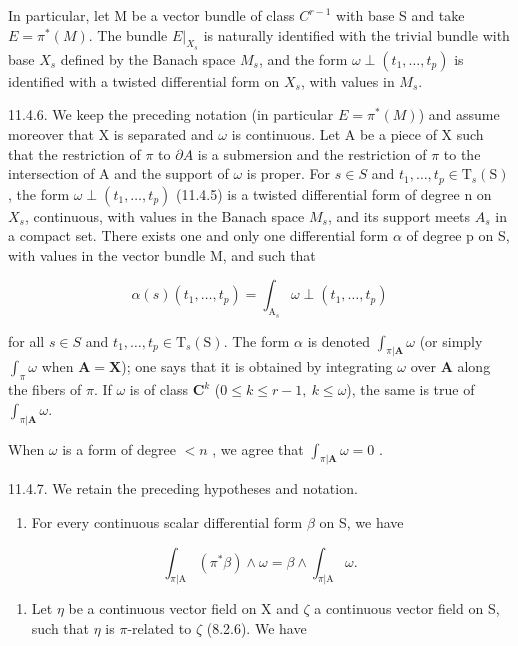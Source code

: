 In particular, let M be a vector bundle of class \(C^{r-1}\) with base S and take \(E = \pi^{*}(M)\). The bundle \(E|_{X_{s}}\) is naturally identified with the trivial bundle with base \(X_{s}\) defined by the Banach space \(M_{s}\), and the form \(\omega\perp(t_{1},\ldots,t_{p})\) is identified with a twisted differential form on \(X_{s}\), with values in \(M_{s}\).

11.4.6. We keep the preceding notation (in particular \(E=\pi^{*}(M)\)) and assume moreover that X is separated and \(\omega\) is continuous. Let A be a piece of X such that the restriction of \(\pi\) to \(\partial A\) is a submersion and the restriction of \(\pi\) to the intersection of A and the support of \(\omega\) is proper. For \(s \in S\) and \(t_{1},\ldots,t_{p}\in\mathrm{T}_{s}(\mathrm{S})\), the form \(\omega \perp (t_{1}, \ldots, t_{p})\) (11.4.5) is a twisted differential form of degree n on \(X_{s}\), continuous, with values in the Banach space \(M_{s}\), and its support meets \(A_{s}\) in a compact set. There exists one and only one differential form \(\alpha\) of degree p on S, with values in the vector bundle M, and such that

\[
\alpha (s) \left(t _ {1}, \dots , t _ {p}\right) = \int_ {\mathrm{A} _ {s}} \omega \perp \left(t _ {1}, \dots , t _ {p}\right)
\]

for all \(s \in S\) and \(t_{1},\ldots,t_{p}\in\mathrm{T}_{s}(\mathrm{S})\). The form \(\alpha\) is denoted \(\int_{\pi|\mathbf{A}} \omega\) (or simply \(\int_{\pi} \omega\) when \(\mathbf{A} = \mathbf{X}\)); one says that it is obtained by integrating \(\omega\) over \(\mathbf{A}\) along the fibers of \(\pi\). If \(\omega\) is of class \(\mathbf{C}^{k}\) (\(0\leqslant k\leqslant r-1,\ k\leqslant\omega\)), the same is true of \(\int_{\pi|\mathbf{A}} \omega\).

When \(\omega\) is a form of degree \(< n\) , we agree that \(\int_{\pi|\mathbf{A}} \omega = 0\) .

11.4.7. We retain the preceding hypotheses and notation.

\begin{enumerate}
\def\labelenumi{\alph{enumi})}
\tightlist
\item
  For every continuous scalar differential form \(\beta\) on S, we have
\end{enumerate}

\[
\int_ {\pi | \mathrm{A}} (\pi^ {*} \beta) \wedge \omega = \beta \wedge \int_ {\pi | \mathrm{A}} \omega .
\]

\begin{enumerate}
\def\labelenumi{\alph{enumi})}
\setcounter{enumi}{1}
\tightlist
\item
  Let \(\eta\) be a continuous vector field on X and \(\zeta\) a continuous vector field on S, such that \(\eta\) is \(\pi\)-related to \(\zeta\) (8.2.6). We have
\end{enumerate}

